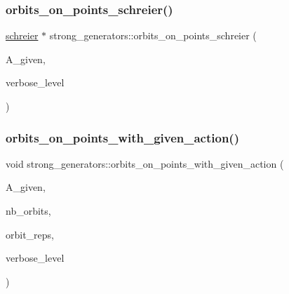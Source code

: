 \mbox{\label{classstrong__generators_adf3f35989ff7ac9fdbcf0a4e241eef9f}} 
\subsubsection{\texorpdfstring{orbits\+\_\+on\+\_\+points\+\_\+schreier()}{orbits\_on\_points\_schreier()}}
{\footnotesize\ttfamily \mbox{\hyperlink{classschreier}{schreier}} $\ast$ strong\+\_\+generators\+::orbits\+\_\+on\+\_\+points\+\_\+schreier (\begin{DoxyParamCaption}\item[{\mbox{\hyperlink{classaction}{action}} $\ast$}]{A\+\_\+given,  }\item[{\mbox{\hyperlink{galois_8h_a09fddde158a3a20bd2dcadb609de11dc}{I\+NT}}}]{verbose\+\_\+level }\end{DoxyParamCaption})}

\mbox{\label{classstrong__generators_ab903661b1847f798b7833035f2d2950c}} 
\subsubsection{\texorpdfstring{orbits\+\_\+on\+\_\+points\+\_\+with\+\_\+given\+\_\+action()}{orbits\_on\_points\_with\_given\_action()}}
{\footnotesize\ttfamily void strong\+\_\+generators\+::orbits\+\_\+on\+\_\+points\+\_\+with\+\_\+given\+\_\+action (\begin{DoxyParamCaption}\item[{\mbox{\hyperlink{classaction}{action}} $\ast$}]{A\+\_\+given,  }\item[{\mbox{\hyperlink{galois_8h_a09fddde158a3a20bd2dcadb609de11dc}{I\+NT}} \&}]{nb\+\_\+orbits,  }\item[{\mbox{\hyperlink{galois_8h_a09fddde158a3a20bd2dcadb609de11dc}{I\+NT}} $\ast$\&}]{orbit\+\_\+reps,  }\item[{\mbox{\hyperlink{galois_8h_a09fddde158a3a20bd2dcadb609de11dc}{I\+NT}}}]{verbose\+\_\+level }\end{DoxyParamCaption})}


